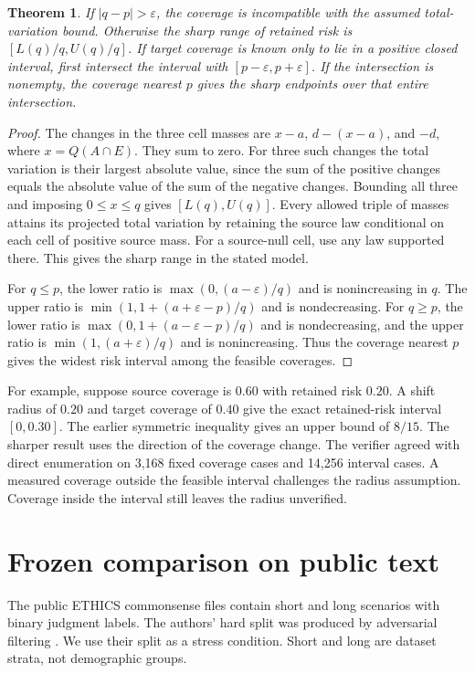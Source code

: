\documentclass[11pt]{article}
\newtheorem{theorem}{Theorem}
\begin{document}
\begin{theorem}
If $|q-p|>\varepsilon$, the coverage is incompatible with
the assumed total-variation bound. Otherwise the sharp range
of retained risk is $[L(q)/q,U(q)/q]$. If target coverage is known
only to lie in a positive closed interval, first intersect the
interval with $[p-\varepsilon,p+\varepsilon]$. If the intersection
is nonempty, the coverage nearest $p$ gives the sharp endpoints
over that entire intersection.
\end{theorem}
\begin{proof}
The changes in the three cell masses are $x-a$, $d-(x-a)$,
and $-d$, where $x=Q(A\cap E)$. They sum to zero. For three
such changes the total variation is their largest absolute
value, since the sum of the positive changes equals the
absolute value of the sum of the negative changes. Bounding
all three and imposing $0\le x\le q$ gives $[L(q),U(q)]$.
Every allowed triple of masses attains its projected total
variation by retaining the source law conditional on each cell
of positive source mass. For a source-null cell, use any law
supported there. This gives the sharp range in the stated model.

For $q\le p$, the lower ratio is
$\max(0,(a-\varepsilon)/q)$ and is nonincreasing in $q$.
The upper ratio is $\min(1,1+(a+\varepsilon-p)/q)$ and
is nondecreasing. For $q\ge p$, the lower ratio is
$\max(0,1+(a-\varepsilon-p)/q)$ and is nondecreasing,
and the upper ratio is $\min(1,(a+\varepsilon)/q)$ and is
nonincreasing. Thus the coverage nearest $p$ gives the widest
risk interval among the feasible coverages.
\end{proof}

For example, suppose source coverage is $0.60$ with retained
risk $0.20$. A shift radius of $0.20$ and target coverage of
$0.40$ give the exact retained-risk interval $[0,0.30]$.
The earlier symmetric inequality gives an upper bound of $8/15$.
The sharper result uses the direction of the coverage change.
The verifier agreed with direct enumeration on 3,168 fixed
coverage cases and 14,256 interval cases. A measured coverage
outside the feasible interval challenges the radius assumption.
Coverage inside the interval still leaves the radius unverified.

\section{Frozen comparison on public text}
The public ETHICS commonsense files contain short and long
scenarios with binary judgment labels. The authors' hard split
was produced by adversarial filtering \cite{hendrycks}. We
use their split as a stress condition. Short and long are
dataset strata, not demographic groups.
\end{document}
